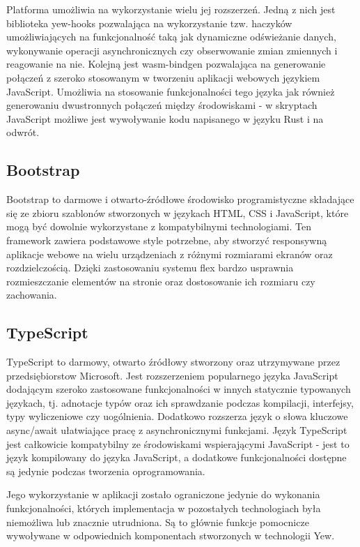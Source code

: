 Platforma umożliwia na wykorzystanie wielu jej rozszerzeń. Jedną z nich jest biblioteka
yew-hooks pozwalająca na wykorzystanie tzw. haczyków umożliwiających na 
funkcjonalność taką jak dynamiczne odświeżanie danych, wykonywanie operacji
asynchronicznych czy obserwowanie zmian zmiennych i reagowanie na nie.
Kolejną jest wasm-bindgen pozwalająca na generowanie połączeń z szeroko stosowanym
w tworzeniu aplikacji webowych językiem JavaScript. Umożliwia na stosowanie
funkcjonalności tego języka jak również generowaniu dwustronnych połączeń między
środowiskami - w skryptach JavaScript możliwe jest wywoływanie kodu napisanego
w języku Rust i na odwrót.

\subsection*{Bootstrap}
Bootstrap to darmowe i otwarto-źródłowe środowisko programistyczne składające się
ze zbioru szablonów stworzonych w językach HTML, CSS i JavaScript, które mogą
być dowolnie wykorzystane z kompatybilnymi technologiami.
Ten framework zawiera podstawowe style potrzebne, aby stworzyć responsywną 
aplikacje webowe na wielu urządzeniach z różnymi rozmiarami ekranów oraz rozdzielczością. 
Dzięki zastosowaniu systemu flex bardzo usprawnia rozmieszczanie elementów na stronie
oraz dostosowanie ich rozmiaru czy zachowania.

\subsection*{TypeScript}
TypeScript to darmowy, otwarto źródłowy stworzony oraz utrzymywane przez przedsiębiorstow Microsoft.
Jest rozszerzeniem popularnego języka JavaScript dodającym szeroko zastosowane funkcjonalności
w innych statycznie typowanych językach, tj. adnotacje typów oraz ich sprawdzanie
podczas kompilacji, interfejsy, typy wyliczeniowe czy uogólnienia.
Dodatkowo rozszerza język o słowa kluczowe async/await ułatwiające pracę
z asynchronicznymi funkcjami. Język TypeScript jest całkowicie kompatybilny ze 
środowiskami wspierającymi JavaScript - jest to język kompilowany do języka JavaScript, a
dodatkowe funkcjonalności dostępne są jedynie podczas tworzenia oprogramowania.

Jego wykorzystanie w aplikacji zostało ograniczone jedynie do wykonania funkcjonalności,
których implementacja w pozostałych technologiach była niemożliwa lub znacznie 
utrudniona. Są to głównie funkcje pomocnicze wywoływane w odpowiednich komponentach
stworzonych w technologii Yew.

